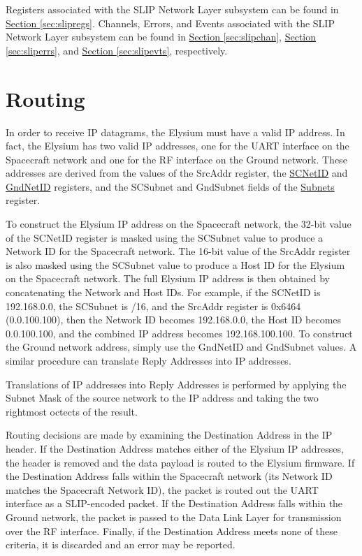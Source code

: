 \documentclass{hitec}
\begin{document}
Registers associated with the SLIP Network Layer subsystem can be found in
\hyperref[sec:slipregs]{Section \ref{sec:slipregs}}. Channels, Errors, and
Events associated with the SLIP Network Layer subsystem can be found in
\hyperref[sec:slipchan]{Section \ref{sec:slipchan}},
\hyperref[sec:sliperrs]{Section \ref{sec:sliperrs}}, and
\hyperref[sec:slipevts]{Section \ref{sec:slipevts}}, respectively.

\section{Routing}
\label{sec:sliproute}

In order to receive IP datagrams, the Elysium must have a valid IP address. In
fact, the Elysium has two valid IP addresses, one for the UART interface on the
Spacecraft network and one for the RF interface on the Ground network.
These addresses are derived from the values of the SrcAddr register, the
\hyperref[reg:scnetid]{SCNetID} and \hyperref[reg:gndnetid]{GndNetID}
registers, and the SCSubnet and GndSubnet fields of the
\hyperref[reg:subnets]{Subnets} register.

To construct the Elysium IP address on the Spacecraft network, the 32-bit value
of the SCNetID register is masked using the SCSubnet value to produce a Network
ID for the Spacecraft network. The 16-bit value of the SrcAddr register is also
masked using the SCSubnet value to produce a Host ID for the Elysium on the
Spacecraft network. The full Elysium IP address is then obtained by
concatenating the Network and Host IDs. For example, if the SCNetID is
192.168.0.0, the SCSubnet is /16, and the SrcAddr register is 0x6464
(0.0.100.100), then the Network ID becomes 192.168.0.0, the Host ID becomes
0.0.100.100, and the combined IP address becomes 192.168.100.100. To construct
the Ground network address, simply use the GndNetID and GndSubnet values. A
similar procedure can translate Reply Addresses into IP addresses.

Translations of IP addresses into Reply Addresses is performed by applying the
Subnet Mask of the source network to the IP address and taking the two
rightmost octects of the result.

Routing decisions are made by examining the Destination Address in the IP
header. If the Destination Address matches either of the Elysium IP addresses,
the header is removed and the data payload is routed to the Elysium firmware.
If the Destination Address falls within the Spacecraft network (its Network ID
matches the Spacecraft Network ID), the packet is routed out the UART interface
as a SLIP-encoded packet. If the Destination Address falls within the Ground
network, the packet is passed to the Data Link Layer for transmission over the
RF interface. Finally, if the Destination Address meets none of these criteria,
it is discarded and an error may be reported.
\end{document}
